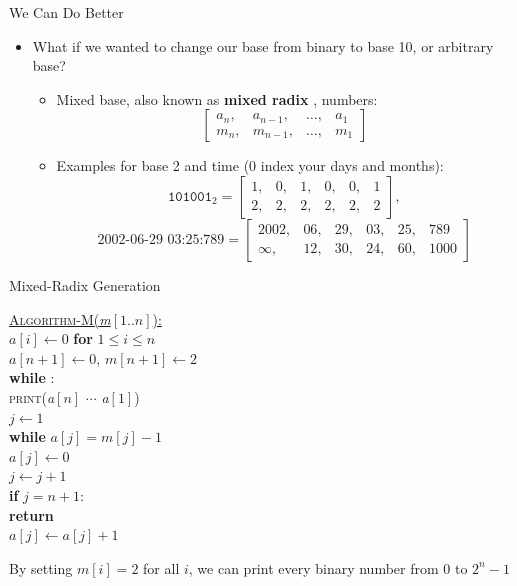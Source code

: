 \documentclass[aspectratio=169]{beamer}
\begin{document}
\begin{frame}{We Can Do Better}
    \begin{itemize}
        \item What if we wanted to change our base from binary to base 10, or arbitrary base?
        \begin{itemize}
            \item Mixed base, also known as \textbf{mixed radix} \cite{TAOCP2}, numbers:
            \[
                \begin{bmatrix}
                            a_n, &a_{n - 1}, &\ldots, &a_1 \\
                            m_n, &m_{n - 1}, &\ldots, &m_1
                \end{bmatrix}
            \]
            \pause
            \item Examples for base 2 and time (0 index your days and months):
            \[
                \texttt{101001}_2 = \begin{bmatrix}
                            1, &0, &1, &0, &0, &1  \\
                            2, &2, &2, &2, &2, &2 
                \end{bmatrix},
            \]
            \[
                \text{2002-06-29 03:25:789} = \begin{bmatrix}
                            2002, &06, &29, &03, &25, &789 \\
                            \infty, &12, &30, &24, &60, &1000 
                \end{bmatrix}
            \]
            \pause
        \end{itemize}
    \end{itemize}
\end{frame}

\begin{frame}{Mixed-Radix Generation}
    \begin{nalgo}
    \underline{\textsc{Algorithm-M}(\emph{m}$[1..n]$):}
    \\\label{}  $a[i] \gets 0$ \textbf{for} $1 \leq i \leq n$ 
    \\\label{}  $a[n + 1] \gets 0$, $m[n + 1] \gets 2$ 
    \\\label{}  \textbf{while} \true:\+
    \\\label{}      \textsc{print}(\emph{a}$[n]$ $\cdots$ \emph{a}$[1]$)
    \\\label{}      $j \gets 1$
    \\\label{}      \textbf{while} $a[j] = m[j] - 1$\+
    \\\label{}          $a[j] \gets 0$
    \\\label{}          $j \gets j + 1$\-
    \\\label{}      \textbf{if} $j = n + 1$:\+
    \\\label{}          \textbf{return}\-
    \\\label{}      $a[j] \gets a[j] + 1$
    \end{nalgo}
    By setting $m[i] = 2$ for all $i$, we can print every binary number from $0$ to $2^n - 1$
\end{frame}
\end{document}
